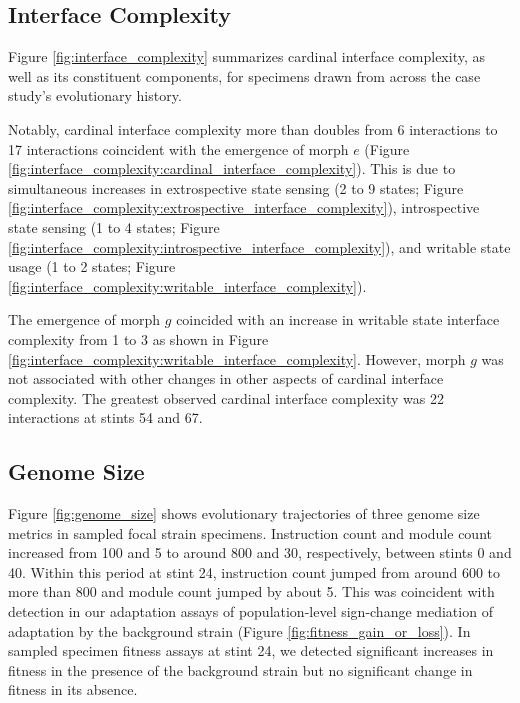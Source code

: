 
\subsection{Interface Complexity}



Figure \ref{fig:interface_complexity} summarizes cardinal interface complexity, as well as its constituent components, for specimens drawn from across the case study's evolutionary history.

Notably, cardinal interface complexity more than doubles from 6 interactions to 17 interactions coincident with the emergence of morph $e$ (Figure \ref{fig:interface_complexity:cardinal_interface_complexity}).
This is due to simultaneous increases in extrospective state sensing (2 to 9 states; Figure \ref{fig:interface_complexity:extrospective_interface_complexity}), introspective state sensing (1 to 4 states; Figure \ref{fig:interface_complexity:introspective_interface_complexity}), and writable state usage (1 to 2 states; Figure \ref{fig:interface_complexity:writable_interface_complexity}).

The emergence of morph $g$ coincided with an increase in writable state interface complexity from 1 to 3 as shown in Figure \ref{fig:interface_complexity:writable_interface_complexity}.
However, morph $g$ was not associated with other changes in other aspects of cardinal interface complexity.
The greatest observed cardinal interface complexity was 22 interactions at stints 54 and 67.

\subsection{Genome Size}



Figure \ref{fig:genome_size} shows evolutionary trajectories of three genome size metrics in sampled focal strain specimens.
Instruction count and module count increased from 100 and 5 to around 800 and 30, respectively, between stints 0 and 40.
Within this period at stint 24, instruction count jumped from around 600 to more than 800 and module count jumped by about 5.
This was coincident with detection in our adaptation assays of population-level sign-change mediation of adaptation by the background strain (Figure \ref{fig:fitness_gain_or_loss}).
In sampled specimen fitness assays at stint 24, we detected significant increases in fitness in the presence of the background strain but no significant change in fitness in its absence.

